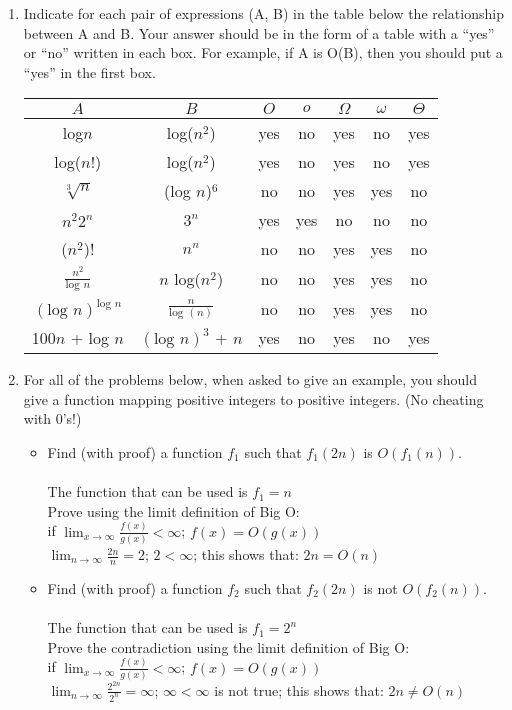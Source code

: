 \documentclass[11pt]{article}
\begin{document}
\begin{enumerate}
\item Indicate for each pair of expressions (A, B) in the table below the relationship between A and B.
Your answer should be in the form of a table with a “yes” or “no” written in each box. For example,
if A is O(B), then you should put a “yes” in the first box.

\vskip 0.25cm
\begin{tabular} {  c  c | c | c | c | c | c |}
 
  $A$ & $B$ & $O$ & $o$ & $\Omega$ &$\omega$ & $\Theta$\\ \hline
  log$n$ & log($n^2$) & yes & no & yes & no & yes \\ \hline
  log($n!$) & log($n^2$) & yes & no & yes & no & yes \\ \hline
  $\sqrt[3]{n}$ & (log $n$)$^6$ & no & no & yes & yes & no \\ \hline
  $n^2$$2^n$ & $3^n$ & yes & yes & no & no & no \\ \hline
  ($n^2$)! & $n^n$ & no & no & yes & yes & no \\ \hline
  $\frac{n^2}{\textrm{log }n}$ & $n$ log($n^2$) & no & no & yes & yes & no  \\ \hline
  $(\textrm{log } n)^{\textrm{log } n}$& $\frac{n}{\textrm{log } (n)}$ & no & no & yes & yes & no \\ \hline
  100$n$ + log $n$ & $(\textrm{log }n)^3$ + $n$& yes & no & yes & no & yes \\ \hline
\end{tabular}
\vskip 0.25cm


\item  For all of the problems below, when asked to give an example, you should give a function mapping
positive integers to positive integers. (No cheating with 0’s!)
\begin{itemize}
\item Find (with proof) a function $f_1$ such that $f_1(2n)$ is $O(f_1(n))$.\\\\
The function that can be used is $f_1 = n$\\
Prove using the limit definition of Big O:\\
if $\lim_{x\to\infty}\frac{f(x)}{g(x)}<\infty$; $f(x) = O(g(x))$\\
$\lim_{n\to\infty}\frac{2n}{n}=2$; $2<\infty$; this shows that:
$2n = O(n)$\\
\item Find (with proof) a function $f_2$ such that $f_2(2n)$ is not $O(f_2(n))$.\\\\
The function that can be used is $f_1 = 2^n$\\
Prove the contradiction using the limit definition of Big O:\\
if $\lim_{x\to\infty}\frac{f(x)}{g(x)}<\infty$; $f(x) = O(g(x))$\\
$\lim_{n\to\infty}\frac{2^{2n}}{2^n}=\infty$; $\infty<\infty$ is not true; this shows that:
$2n \neq O(n)$\\


\end{itemize}
\end{enumerate}
\end{document}
